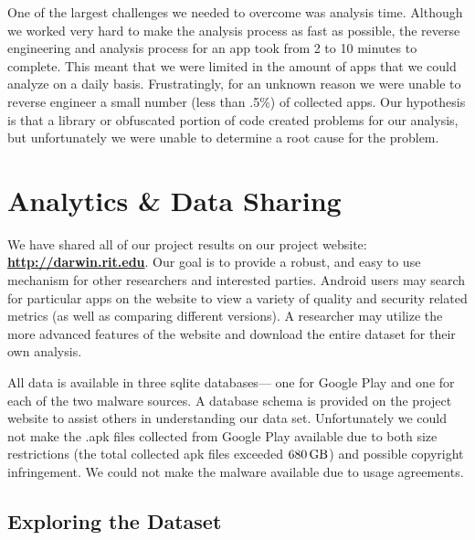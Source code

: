 \documentclass{sig-alternate-05-2015}
\begin{document}
One of the largest challenges we needed to overcome was analysis time. Although we worked very hard to make the analysis process as fast as possible, the reverse engineering and analysis process for an app took from 2 to 10 minutes to complete. This meant that we were limited in the amount of apps that we could analyze on a daily basis. Frustratingly, for an unknown reason we were unable to reverse engineer a small number (less than .5\%) of collected apps. Our hypothesis is that a library or obfuscated portion of code created problems for our analysis, but unfortunately we were unable to determine a root cause for the problem.





\section{Analytics \& Data Sharing}
\label{sec: Website}

We have shared all of our project results on our project website: \textbf{\url{http://darwin.rit.edu}}. Our goal is to provide a robust, and easy to use mechanism for other researchers and interested parties. Android users may search for particular apps on the website to view a variety of quality and security related metrics (as well as comparing different versions). A researcher may utilize the more advanced features of the website and download the entire dataset for their own analysis.

All data is available in three sqlite databases--- one for Google Play and one for each of the two malware sources. A database schema is provided on the project website to assist others in understanding our data set. Unfortunately we could not make the .apk files collected from Google Play available due to both size restrictions (the total collected apk files exceeded $\SI{680}{\giga\byte}$) and possible copyright infringement. We could not make the malware available due to usage agreements.



\subsection{Exploring the Dataset}

\end{document}
